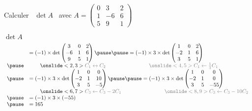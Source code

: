 \begin{frame}

\begin{exemple}
Calculer \  $\det A$ \  avec 
$A  = \begin{pmatrix}
        0 & 3 & 2\\
        1 & -6 & 6\\
        5 & 9 & 1  
       \end{pmatrix}$

\pause     \pause
 $\det A $  \vspace{-.3cm}    
$$\begin{array}{rl}
  & =   
   (-1)\times \det \begin{pmatrix}
        3 & 0 & 2\\
        -6& 1 & 6\\
        9 & 5 & 1  
       \end{pmatrix}  \pause   \pause
 =   (-1)\times 3 \times \det \begin{pmatrix}
        1 & 0 & 2\\
        -2& 1 & 6\\
        3 & 5 & 1  
       \end{pmatrix}       \\ \pause  
 &  \qquad \onslide<2,3>\color{gray}{C_1 \leftrightarrow C_2}   \qquad \qquad \qquad \qquad  \onslide<4,5>\color{gray}{C_1 \leftarrow \frac{1}{3} C_1} \\ \pause
 & =   (-1)\times 3 \times \det \begin{pmatrix}
        1 & 0 & 0\\
        -2& 1 & 10\\
        3 & 5 & -5  
       \end{pmatrix}       \pause  \pause  
   = (-1)\times 3 \times \det \begin{pmatrix}
        1 & 0 & 0\\
        -2& 1 & 0\\
        3 & 5 & -55  
       \end{pmatrix}        \\ 
&     \qquad \onslide<6,7> \color{gray}{C_3 \leftarrow C_3-2C_1 }  \qquad \qquad  \qquad\qquad \onslide<8,9>\color{gray}{ C_3 \leftarrow C_3-10C_2 }\\ \pause  
& =   (-1)\times 3 \times (-55)  \\\pause  
& =  165 
\end{array}$$

\end{exemple}  

\end{frame}


